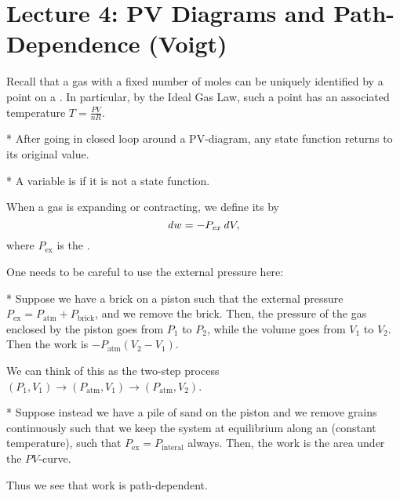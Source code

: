 \section*{Lecture 4: PV Diagrams and Path-Dependence (Voigt)}
\setcounter{section}{4}
\setcounter{subsection}{0}
\setcounter{defn}{0}
\setcounter{defncontainer}{0}

Recall that a gas with a fixed number of moles can be uniquely identified by a point on a .
In particular, by the Ideal Gas Law, such a point has an associated temperature $T = \frac{PV}{nR}$.

\begin{fact}*
	After going in closed loop around a PV-diagram, any state function returns to its original value. 
\end{fact}

\begin{defn}*
	A variable is  if it is not a state function.
\end{defn}

\begin{defn}
	When a gas is expanding or contracting, we define its  by \[
		\text{\emph{d}}w = -P_{\text{\emph{ex}}} \, \text{\emph{d}}V,
	\]
	where $P_{\text{ex}}$ is the .
\end{defn}

One needs to be careful to use the external pressure here:

\begin{exm}*
	Suppose we have a brick on a piston such that the external pressure $P_{\text{ex}} = P_{\text{atm}} + P_{\text{brick}}$, and we remove the brick. Then, the pressure of the gas enclosed by the piston goes from $P_1$ to $P_2$, while the volume goes from $V_1$ to $V_2$. Then the work is $-P_{\text{atm}}(V_2-V_1)$.
\end{exm}

We can think of this as the two-step process $(P_1, V_1) \to (P_{\text{atm}}, V_1) \to (P_{\text{atm}}, V_2)$.

\begin{exm}*
	Suppose instead we have a pile of sand on the piston and we remove grains continuously such that we keep the system at equilibrium along an  (constant temperature), such that $P_{\text{ex}} = P_{\text{interal}}$ always. Then, the work is the area under the $PV$-curve. 
\end{exm}

Thus we see that work is path-dependent.
